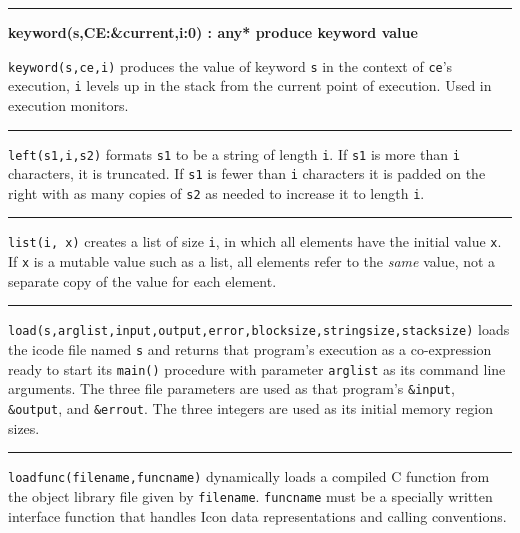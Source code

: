 \bigskip\hrule\vspace{0.1cm}
\noindent
{\bf keyword(s,CE:\&current,i:0) : any* \hfill produce keyword value}

\noindent
{}\texttt{keyword(s,ce,i)} produces the value of keyword
\texttt{s} in the context of \texttt{ce}'s execution,
\texttt{i} levels up in the stack from the current point of execution.
Used in execution monitors.

\bigskip\hrule\vspace{0.1cm}

\noindent
{}\texttt{left(s1,i,s2)} formats \texttt{s1} to be a string
of length \texttt{i}. If \texttt{s1} is more than \texttt{i}
characters, it is truncated. If \texttt{s1} is fewer than \texttt{i}
characters it is padded on the right with as many copies of \texttt{s2}
as needed to increase it to length \texttt{i}.

\bigskip\hrule\vspace{0.1cm}

\noindent
{}\texttt{list(i, x)} creates a list of size \texttt{i},
in which all elements have the initial value \texttt{x}. If \texttt{x}
is a mutable value such as a list, all elements refer to the
\textit{same} value, not a separate copy of the value for each element.

\bigskip\hrule\vspace{0.1cm}

\noindent
{}\texttt{load(s,arglist,input,output,error,blocksize,stringsize,stacksize)}
loads the icode file named \texttt{s} and returns that
program's execution as a co-expression ready to start
its \texttt{main()} procedure with parameter \texttt{arglist} as its
command line arguments. The three file parameters are used as that
program's \texttt{\&input}, \texttt{\&output}, and
\texttt{\&errout}. The three integers are used as its initial memory
region sizes.

\bigskip\hrule\vspace{0.1cm}

\noindent
{}\texttt{loadfunc(filename,funcname)} dynamically
loads a compiled C function from the object library file given by
\texttt{filename}. \texttt{funcname} must be a specially written
interface function that handles Icon data representations and calling
conventions.

